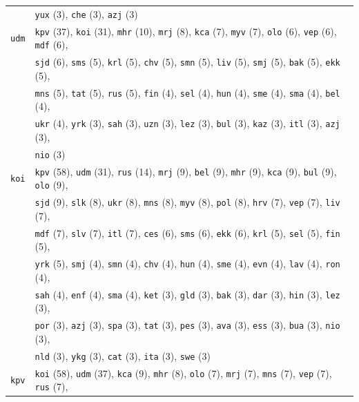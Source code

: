 \begin{center}
\begin{longtable}{ll}
 & \texttt{yux} (3), \texttt{che} (3), \texttt{azj} (3) \\
\texttt{udm} & \texttt{kpv} (37), \texttt{koi} (31), \texttt{mhr} (10), \texttt{mrj} (8), \texttt{kca} (7), \texttt{myv} (7), \texttt{olo} (6), \texttt{vep} (6), \texttt{mdf} (6), \\
 & \texttt{sjd} (6), \texttt{sms} (5), \texttt{krl} (5), \texttt{chv} (5), \texttt{smn} (5), \texttt{liv} (5), \texttt{smj} (5), \texttt{bak} (5), \texttt{ekk} (5), \\
 & \texttt{mns} (5), \texttt{tat} (5), \texttt{rus} (5), \texttt{fin} (4), \texttt{sel} (4), \texttt{hun} (4), \texttt{sme} (4), \texttt{sma} (4), \texttt{bel} (4), \\
 & \texttt{ukr} (4), \texttt{yrk} (3), \texttt{sah} (3), \texttt{uzn} (3), \texttt{lez} (3), \texttt{bul} (3), \texttt{kaz} (3), \texttt{itl} (3), \texttt{azj} (3), \\
 & \texttt{nio} (3) \\
\texttt{koi} & \texttt{kpv} (58), \texttt{udm} (31), \texttt{rus} (14), \texttt{mrj} (9), \texttt{bel} (9), \texttt{mhr} (9), \texttt{kca} (9), \texttt{bul} (9), \texttt{olo} (9), \\
 & \texttt{sjd} (9), \texttt{slk} (8), \texttt{ukr} (8), \texttt{mns} (8), \texttt{myv} (8), \texttt{pol} (8), \texttt{hrv} (7), \texttt{vep} (7), \texttt{liv} (7), \\
 & \texttt{mdf} (7), \texttt{slv} (7), \texttt{itl} (7), \texttt{ces} (6), \texttt{sms} (6), \texttt{ekk} (6), \texttt{krl} (5), \texttt{sel} (5), \texttt{fin} (5), \\
 & \texttt{yrk} (5), \texttt{smj} (4), \texttt{smn} (4), \texttt{chv} (4), \texttt{hun} (4), \texttt{sme} (4), \texttt{evn} (4), \texttt{lav} (4), \texttt{ron} (4), \\
 & \texttt{sah} (4), \texttt{enf} (4), \texttt{sma} (4), \texttt{ket} (3), \texttt{gld} (3), \texttt{bak} (3), \texttt{dar} (3), \texttt{hin} (3), \texttt{lez} (3), \\
 & \texttt{por} (3), \texttt{azj} (3), \texttt{spa} (3), \texttt{tat} (3), \texttt{pes} (3), \texttt{ava} (3), \texttt{ess} (3), \texttt{bua} (3), \texttt{nio} (3), \\
 & \texttt{nld} (3), \texttt{ykg} (3), \texttt{cat} (3), \texttt{ita} (3), \texttt{swe} (3) \\
\texttt{kpv} & \texttt{koi} (58), \texttt{udm} (37), \texttt{kca} (9), \texttt{mhr} (8), \texttt{olo} (7), \texttt{mrj} (7), \texttt{mns} (7), \texttt{vep} (7), \texttt{rus} (7), \\

\end{longtable}
\end{center}
